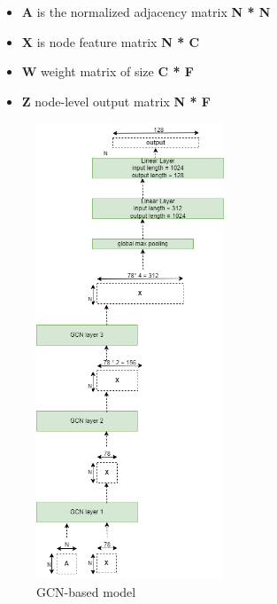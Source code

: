 \documentclass[11pt, a4paper]{article}
\begin{document}
                \begin{itemize}
                    \item \textbf{A} is the normalized adjacency matrix \textbf{N * N}
                    \item \textbf{X} is node feature matrix \textbf{N * C}
                    \item \textbf{W} weight matrix of size \textbf{C * F}
                    \item \textbf{Z} node-level output matrix \textbf{N * F}
                \end{itemize}

                \begin{figure}[H]
                    \centering
                    \includegraphics[width=0.5\textwidth]{model/GCN-based.drawio.png} %
                    \caption{GCN-based model}
                \end{figure}
\end{document}
